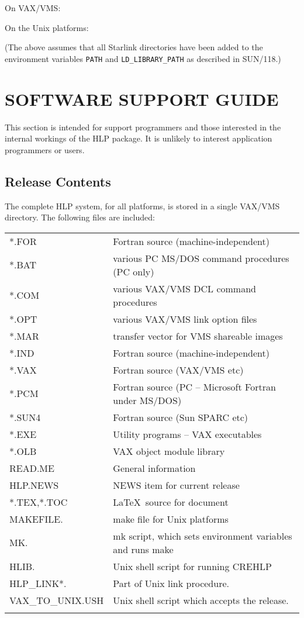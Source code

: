 \documentclass[11pt,nolof]{starlink}
\begin{document}
On VAX/VMS:

On the Unix platforms:
\begin{terminalv}
\end{terminalv}
(The above assumes that all Starlink directories
have been added to the environment variables \texttt{PATH} and
\texttt{LD\_LIBRARY\_PATH} as described in SUN/118.)

\section{SOFTWARE SUPPORT GUIDE}
This section is intended for support programmers and those interested
in the internal workings of the HLP package.  It is unlikely to
interest application programmers or users.

\subsection{Release Contents}
The complete HLP system, for all platforms,
is stored in a single VAX/VMS directory.
The following files are included:

\begin{tabular}{ll}
\\
 *.FOR & Fortran source (machine-independent) \\
 *.BAT & various PC MS/DOS command procedures (PC only)\\
 *.COM & various VAX/VMS DCL command procedures \\
 *.OPT & various VAX/VMS link option files \\
 *.MAR & transfer vector for VMS shareable images \\
 *.IND & Fortran source (machine-independent) \\
 *.VAX & Fortran source (VAX/VMS etc) \\
 *.PCM & Fortran source (PC -- Microsoft Fortran under MS/DOS) \\
 *.SUN4 & Fortran source (Sun SPARC etc) \\
 *.EXE & Utility programs -- VAX executables \\
 *.OLB & VAX object module library \\
 READ.ME & General information \\
 HLP.NEWS & NEWS item for current release \\
 *.TEX,*.TOC & \LaTeX\ source for document \\
 MAKEFILE. & make file for Unix platforms \\
 MK. & mk script, which sets environment variables and runs make \\
 HLIB. & Unix shell script for running CREHLP \\
 HLP\_LINK*. & Part of Unix link procedure. \\
 VAX\_TO\_UNIX.USH & Unix shell script which accepts the release. \\ \\
\end{tabular}
\end{document}
